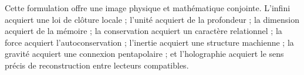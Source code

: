 Cette formulation offre une image physique et mathématique conjointe. L'infini acquiert une loi de clôture locale ; l'unité acquiert de la profondeur ; la dimension acquiert de la mémoire ; la conservation acquiert un caractère relationnel ; la force acquiert l'autoconservation ; l'inertie acquiert une structure machienne ; la gravité acquiert une connexion pentapolaire ; et l'holographie acquiert le sens précis de reconstruction entre lecteurs compatibles.
